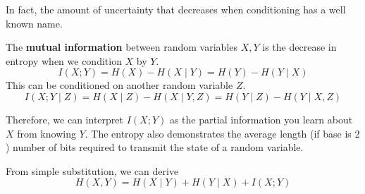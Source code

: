 \documentclass{article}
\begin{document}
    In fact, the amount of uncertainty that decreases when conditioning has a well known name. 

    \begin{definition}
      The \textbf{mutual information} between random variables $X, Y$ is the decrease in entropy when we condition $X$ by $Y$. 
      \begin{equation}
        I(X ; Y) = H(X) - H(X \mid Y) = H(Y) - H(Y \mid X)
      \end{equation}
      This can be conditioned on another random variable $Z$. 
      \begin{equation}
        I(X ; Y \mid Z) = H(X \mid Z) - H(X \mid Y, Z) = H(Y \mid Z) - H(Y \mid X, Z)
      \end{equation}
    \end{definition}
    
    Therefore, we can interpret $I(X; Y)$ as the partial information you learn about $X$ from knowing $Y$. The entropy also demonstrates the average length (if base is $2$) number of bits required to transmit the state of a random variable. 

    \begin{theorem}
      From simple substitution, we can derive 
      \begin{equation}
        H(X, Y) = H(X \mid Y) + H(Y \mid X) + I(X; Y)
      \end{equation}
    \end{theorem}
\end{document}
